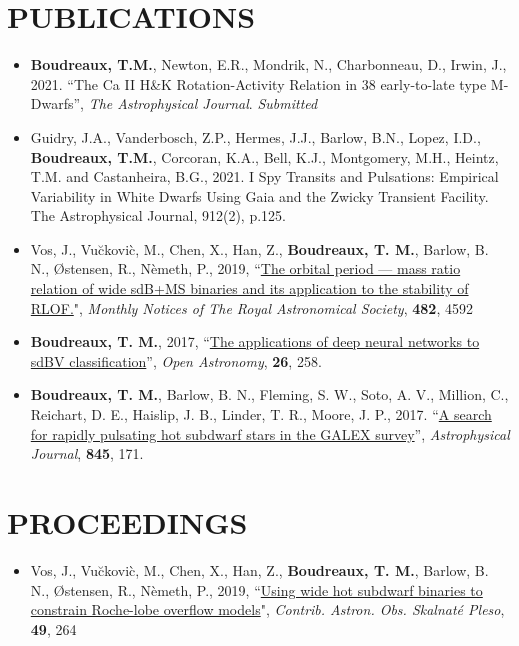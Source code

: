 \documentclass[margin, 10pt]{res} %
\begin{document}
\begin{resume}
\section{PUBLICATIONS}
\begin{itemize}
	\item \textbf{Boudreaux, T.M.}, Newton, E.R., Mondrik, N., Charbonneau, D., Irwin, J., 2021. ``The Ca II H\&K Rotation-Activity Relation in 38 early-to-late type M-Dwarfs'', \textit{The Astrophysical Journal}. \textit{Submitted}
\item Guidry, J.A., Vanderbosch, Z.P., Hermes, J.J., Barlow, B.N., Lopez, I.D., \textbf{Boudreaux, T.M.}, Corcoran, K.A., Bell, K.J., Montgomery, M.H., Heintz, T.M. and Castanheira, B.G., 2021. I Spy Transits and Pulsations: Empirical Variability in White Dwarfs Using Gaia and the Zwicky Transient Facility. The Astrophysical Journal, 912(2), p.125.
\item Vos, J., Vu\u{c}kovi\`c, M., Chen, X., Han, Z., \textbf{Boudreaux, T. M.}, Barlow, B. N., \O stensen, R., N\`emeth, P., 2019, ``\href{https://ui.adsabs.harvard.edu/#abs/2019MNRAS.482.4592V/abstract}{The orbital period --- mass ratio relation of wide sdB+MS binaries and its application to the stability of RLOF.}", \textit{Monthly Notices of The Royal Astronomical Society}, \textbf{482}, 4592 
\item \textbf{Boudreaux, T. M.}, 2017, ``\href{https://ui.adsabs.harvard.edu/#abs/2017OAst...26..258B/abstract}{The applications of deep neural networks to sdBV classification}'', \textit{Open Astronomy}, \textbf{26}, 258.
\item \textbf{Boudreaux, T. M.}, Barlow, B. N., Fleming, S. W., Soto, A. V., Million, C., Reichart, D. E., Haislip, J. B., Linder, T. R., Moore, J. P., 2017. ``\href{https://ui.adsabs.harvard.edu/#abs/2017ApJ...845..171B/abstract}{A search for rapidly pulsating hot subdwarf stars in the GALEX survey}'', \textit{Astrophysical Journal}, \textbf{845}, 171.
\end{itemize}

\section{PROCEEDINGS}
\begin{itemize}
\item Vos, J., Vu\u{c}kovi\`c, M., Chen, X., Han, Z., \textbf{Boudreaux, T. M.}, Barlow, B. N., \O stensen, R., N\`emeth, P., 2019, ``\href{http://www.ta3.sk/caosp/Eedition/FullTexts/vol49no2/pp264-270.pdf}{Using wide hot subdwarf binaries to constrain Roche-lobe overflow models}", \textit{Contrib. Astron. Obs. Skalnaté Pleso}, \textbf{49}, 264 
\end{itemize}


\end{resume}
\end{document}
